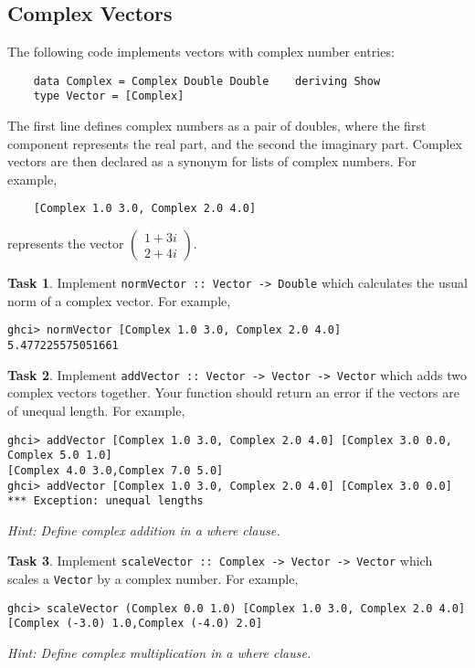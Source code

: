 \documentclass{article}[12pt]
\theoremstyle{definition}
\newtheorem{task}{Task}
\begin{document}
\subsection{Complex Vectors}
The following code implements vectors with complex number entries:
\begin{verbatim}
    data Complex = Complex Double Double    deriving Show
    type Vector = [Complex] 
\end{verbatim}
The first line defines complex numbers as a pair of doubles, where the first component represents the real part, and the second the imaginary part. Complex vectors are then declared as a synonym for lists of complex numbers. For example,
\begin{verbatim}
    [Complex 1.0 3.0, Complex 2.0 4.0]\end{verbatim}
represents the vector $\begin{pmatrix} 1+3i \\ 2 + 4i \end{pmatrix}$.

\begin{task}
    Implement \verb|normVector :: Vector -> Double| which calculates the usual norm of a complex vector.  
    For example,
    \begin{verbatim}
ghci> normVector [Complex 1.0 3.0, Complex 2.0 4.0]
5.477225575051661\end{verbatim}
\end{task}

\begin{task}
    Implement \verb|addVector :: Vector -> Vector -> Vector| which adds two complex vectors together. Your function should return an error if the vectors are of unequal length.  
    For example,
    \begin{verbatim}
ghci> addVector [Complex 1.0 3.0, Complex 2.0 4.0] [Complex 3.0 0.0, Complex 5.0 1.0]
[Complex 4.0 3.0,Complex 7.0 5.0]
ghci> addVector [Complex 1.0 3.0, Complex 2.0 4.0] [Complex 3.0 0.0]
*** Exception: unequal lengths\end{verbatim}
    \emph{Hint: Define complex addition in a where clause.}
\end{task}

\begin{task}
    Implement \verb|scaleVector :: Complex -> Vector -> Vector| which scales a \verb|Vector| by a complex number.  
    For example,
    \begin{verbatim}
ghci> scaleVector (Complex 0.0 1.0) [Complex 1.0 3.0, Complex 2.0 4.0]
[Complex (-3.0) 1.0,Complex (-4.0) 2.0]\end{verbatim}
    \emph{Hint: Define complex multiplication in a where clause.}
\end{task}
\end{document}
